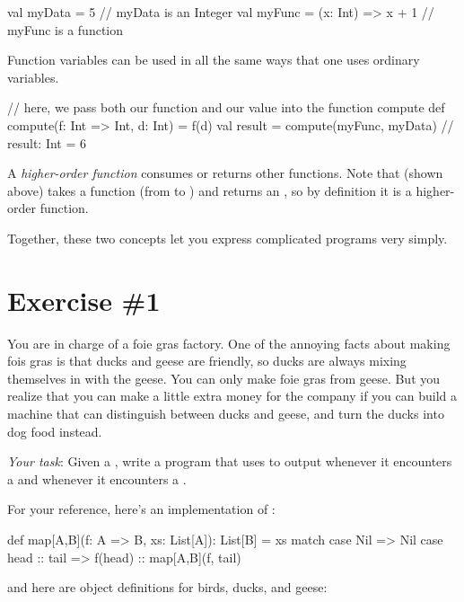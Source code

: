 \documentclass{book}
\begin{document}
\begin{scalacode}
val myData = 5                  // myData is an Integer
val myFunc = (x: Int) => x + 1  // myFunc is a function
\end{scalacode}

Function variables can be used in all the same ways that one uses ordinary variables.

\begin{scalacode}
// here, we pass both our function and our value into the function compute
def compute(f: Int => Int, d: Int) = f(d)
val result = compute(myFunc, myData)
// result: Int = 6
\end{scalacode}

A \emph{higher-order function} consumes or returns other functions.  Note that  (shown above) takes a function (from  to ) and returns an , so by definition it is a higher-order function.

Together, these two concepts let you express complicated programs very simply.

\section{Exercise \#1}

You are in charge of a foie gras factory.  One of the annoying facts about making fois gras is that ducks and geese are friendly, so ducks are always mixing themselves in with the geese.  You can only make foie gras from geese.  But you realize that you can make a little extra money for the company if you can build a machine that can distinguish between ducks and geese, and turn the ducks into dog food instead.

\emph{Your task}: Given a , write a program that uses  to output  whenever it encounters a  and  whenever it encounters a .

For your reference, here's an implementation of :

\begin{scalacode}
def map[A,B](f: A => B, xs: List[A]): List[B] = xs match {
  case Nil => Nil
  case head :: tail => f(head) :: map[A,B](f, tail)
}
\end{scalacode}

and here are object definitions for birds, ducks, and geese:
\end{document}

